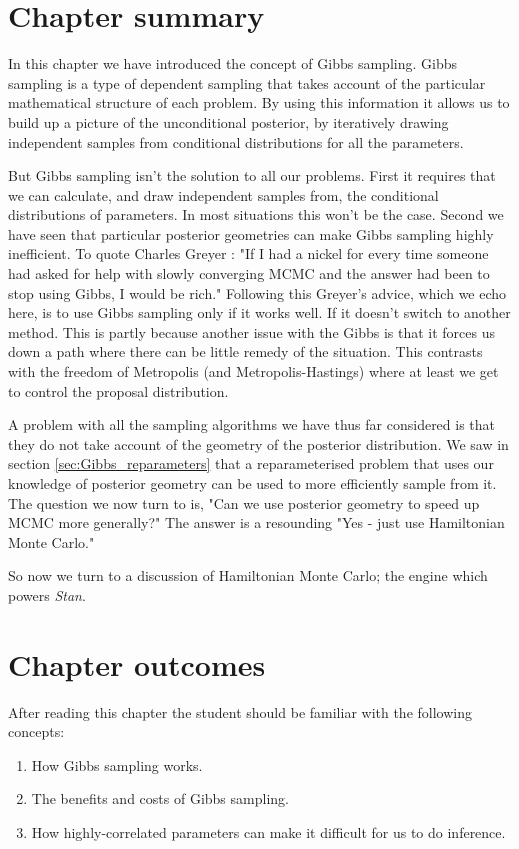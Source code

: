 \documentclass[11pt,fullpage]{book}
\begin{document}
\section{Chapter summary}
In this chapter we have introduced the concept of Gibbs sampling. Gibbs sampling is a type of dependent sampling that takes account of the particular mathematical structure of each problem. By using this information it allows us to build up a picture of the unconditional posterior, by iteratively drawing independent samples from conditional distributions for all the parameters.

But Gibbs sampling isn't the solution to all our problems. First it requires that we can calculate, and draw independent samples from, the conditional distributions of parameters. In most situations this won't be the case. Second we have seen that particular posterior geometries can make Gibbs sampling highly inefficient. To quote Charles Greyer \cite{brooks2011handbook}: "If I had a nickel for every time someone had asked for help with slowly converging MCMC and the answer had been to stop using Gibbs, I would be rich." Following this Greyer's advice, which we echo here, is to use Gibbs sampling only if it works well. If it doesn't switch to another method. This is partly because another issue with the Gibbs is that it forces us down a path where there can be little remedy of the situation. This contrasts with the freedom of Metropolis (and Metropolis-Hastings) where at least we get to control the proposal distribution. 

A problem with all the sampling algorithms we have thus far considered is that they do not take account of the geometry of the posterior distribution. We saw in section \ref{sec:Gibbs_reparameters} that a reparameterised problem that uses our knowledge of posterior geometry can be used to more efficiently sample from it. The question we now turn to is, "Can we use posterior geometry to speed up MCMC more generally?" The answer is a resounding "Yes - just use Hamiltonian Monte Carlo." 

So now we turn to a discussion of Hamiltonian Monte Carlo; the engine which powers \textit{Stan}.

\section{Chapter outcomes}
After reading this chapter the student should be familiar with the following concepts:
%
\begin{enumerate}
\item How Gibbs sampling works.
\item The benefits and costs of Gibbs sampling.
\item How highly-correlated parameters can make it difficult for us to do inference.
\end{enumerate}
\end{document}
